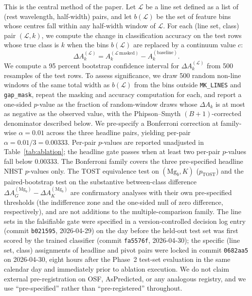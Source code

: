 \documentclass[11pt,a4paper]{article}
\newcommand{\dA}{\Delta A}
\begin{document}
This is the central method of the paper. Let $\mathcal{L}$ be a line set defined as a list of (rest wavelength, half-width) pairs, and let $b(\mathcal{L})$ be the set of feature bins whose centres fall within any half-width window of $\mathcal{L}$. For each (line set, class) pair $(\mathcal{L}, k)$, we compute the change in classification accuracy on the test rows whose true class is $k$ when the bins $b(\mathcal{L})$ are replaced by a continuum value $c$:
\begin{equation}
\dA_k^{(\mathcal{L})} = A_k^{(\mathcal{L}\,\text{masked})} - A_k^{(\text{baseline})}.
\label{eq:delta-acc}
\end{equation}
We compute a 95 percent bootstrap confidence interval for $\dA_k^{(\mathcal{L})}$ from 500 resamples of the test rows. To assess significance, we draw 500 random non-line windows of the same total width as $b(\mathcal{L})$ from the bins outside \texttt{MK\_LINES} and \texttt{gap\_mask}, repeat the masking and accuracy computation for each, and report a one-sided $p$-value as the fraction of random-window draws whose $\dA_k$ is at most as negative as the observed value, with the Phipson--Smyth $(B+1)$-corrected denominator described below. We pre-specify a Bonferroni correction at family-wise $\alpha = 0.01$ across the three headline pairs, yielding per-pair $\alpha = 0.01 / 3 = 0.00333$. Per-pair $p$-values are reported unadjusted in Table~\ref{tab:ablation}; the headline gate passes when at least two per-pair $p$-values fall below $0.00333$. The Bonferroni family covers the three pre-specified headline NHST $p$-values only. The TOST equivalence test on $(\mathrm{Mg}_b, K)$ ($p_{\mathrm{TOST}}$) and the paired-bootstrap test on the substantive between-class difference $\dA_G^{(\mathrm{Mg}_b)} - \dA_K^{(\mathrm{Mg}_b)}$ are confirmatory analyses with their own pre-specified thresholds (the indifference zone and the one-sided null of zero difference, respectively), and are not additions to the multiple-comparison family. The line sets in the falsifiable gate were specified in a version-controlled decision log entry (commit \texttt{b021595}, 2026-04-29) on the day before the held-out test set was first scored by the trained classifier (commit \texttt{fa5576f}, 2026-04-30); the specific (line set, class) assignments of headline and pivot pairs were locked in commit \texttt{0682aa5} on 2026-04-30, eight hours after the Phase~2 test-set evaluation in the same calendar day and immediately prior to ablation execution. We do not claim external pre-registration on OSF, AsPredicted, or any analogous registry, and we use ``pre-specified'' rather than ``pre-registered'' throughout.
\end{document}
